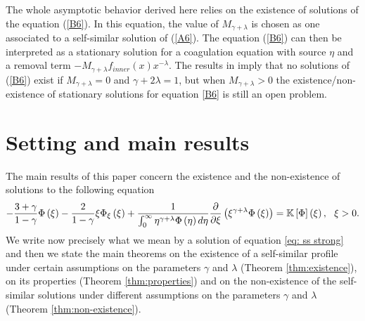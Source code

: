 \documentclass[11pt]{article}
\numberwithin{equation}{section}
\theoremstyle{plain}
\newcommand{\der}{\textup{d}}
\begin{document}
The whole asymptotic behavior derived here relies on the
existence of solutions of the equation (\ref{B6}).
In this equation, the value
of $M_{\gamma+\lambda}$ is chosen as one associated to a self-similar solution
of (\ref{A6}). The equation (\ref{B6}) can then be interpreted as a stationary
solution for a coagulation equation with source $\eta$ and a removal term
$-M_{\gamma+\lambda}f_{inner}\left(  x\right)  x^{-\lambda}.$ The
results in \cite{ferreira2019stationary} imply that no solutions of (\ref{B6}) exist if
$M_{\gamma+\lambda}=0$ and $\gamma+2\lambda=1$, but when $M_{\gamma+\lambda} >0$ the existence/non-existence of stationary solutions for equation \eqref{B6} is still an open problem. 



\section{Setting and main results} \label{sec:main}
The main results of this paper concern the existence and the non-existence of solutions to the following equation 
\begin{equation} \label{eq: ss strong} 
-\frac{3+\gamma}{1-\gamma}\Phi\left(  \xi\right)  -\frac{2}{1-\gamma}\xi
\Phi_{\xi}\left(  \xi\right)  +\frac{1}{\int_{0}^{\infty}\eta^{\gamma+\lambda
}\Phi\left(  \eta\right)  \der \eta}\frac{\partial}{\partial\xi}\left(
\xi^{\gamma+\lambda}\Phi\left(  \xi\right)  \right)  =\mathbb{K}\left[
\Phi\right]  \left(  \xi\right) ,\ \ \xi>0.
\end{equation}
We write now precisely what we mean by a solution of equation \eqref{eq: ss strong} and then we state the main theorems on the  existence of a self-similar profile under certain assumptions on the parameters $\gamma $ and $\lambda $ (Theorem \ref{thm:existence}), on its properties (Theorem \ref{thm:properties}) and on the non-existence of the self-similar solutions under different assumptions on the parameters $\gamma $ and $\lambda $ (Theorem \ref{thm:non-existence}).  
\end{document}

